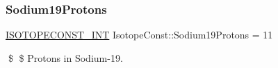 \subsubsection{\texorpdfstring{Sodium19\+Protons}{Sodium19Protons}}
{\footnotesize\ttfamily \mbox{\hyperlink{group___isotope_const-_macros_ga5f18360b3e99483a35c32d789e62621c}{I\+S\+O\+T\+O\+P\+E\+C\+O\+N\+S\+T\+\_\+\+I\+NT}} Isotope\+Const\+::\+Sodium19\+Protons = 11}

\$ \$ Protons in Sodium-\/19. 